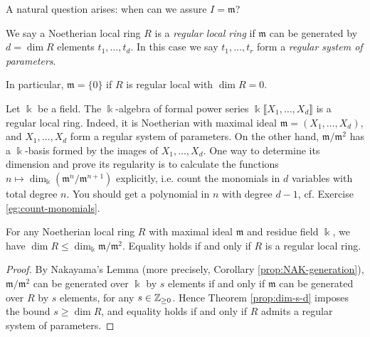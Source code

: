 A natural question arises: when can we assure $I=\mathfrak{m}$?
\begin{definition}
	We say a Noetherian local ring $R$ is a \emph{regular local ring} if $\mathfrak{m}$ can be generated by $d = \dim R$ elements $t_1, \ldots, t_d$. In this case we say $t_1, \ldots, t_r$ form a \emph{regular system of parameters}.
\end{definition}
In particular, $\mathfrak{m}=\{0\}$ if $R$ is regular local with $\dim R = 0$.

\begin{exercise}
	Let $\Bbbk$ be a field. The $\Bbbk$-algebra of formal power series $\Bbbk\llbracket X_1, \ldots, X_d \rrbracket$ is a regular local ring. Indeed, it is Noetherian with maximal ideal $\mathfrak{m} = (X_1, \ldots, X_d)$, and $X_1, \ldots, X_d$ form a regular system of parameters. On the other hand, $\mathfrak{m}/\mathfrak{m}^2$ has a $\Bbbk$-basis formed by the images of $X_1, \ldots, X_d$. One way to determine its dimension and prove its regularity is to calculate the functions $n \mapsto \dim_\Bbbk(\mathfrak{m}^n/\mathfrak{m}^{n+1})$ explicitly, i.e. count the monomials in $d$ variables with total degree $n$. You should get a polynomial in $n$ with degree $d-1$, cf. Exercise \ref{eg:count-monomials}.
\end{exercise}

\begin{theorem}
	For any Noetherian local ring $R$ with maximal ideal $\mathfrak{m}$ and residue field $\Bbbk$, we have $\dim R \leq \dim_\Bbbk \mathfrak{m}/\mathfrak{m}^2$. Equality holds if and only if $R$ is a regular local ring.
\end{theorem}
\begin{proof}
	By Nakayama's Lemma (more precisely, Corollary \ref{prop:NAK-generation}), $\mathfrak{m}/\mathfrak{m}^2$ can be generated over $\Bbbk$ by $s$ elements if and only if $\mathfrak{m}$ can be generated over $R$ by $s$ elements, for any $s \in \mathbb{Z}_{\geq 0}$. Hence Theorem \ref{prop:dim-s-d} imposes the bound $s \geq \dim R$, and equality holds if and only if $R$ admits a regular system of parameters.
\end{proof}


